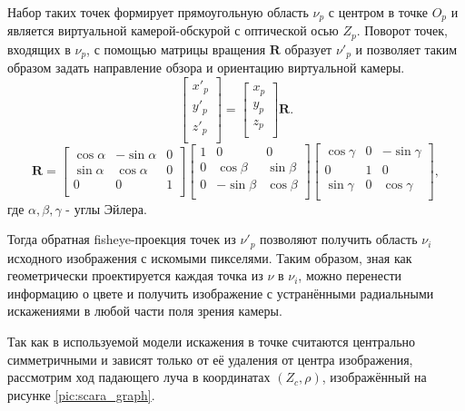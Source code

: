 Набор таких точек формирует прямоугольную область $\nu_p$ с центром в точке $O_p$ и является виртуальной камерой-обскурой        %
с оптической осью $Z_p$. Поворот точек, входящих в $\nu_p$, с помощью матрицы вращения $\bm{R}$ образует $\nu'_p$ и
 позволяет таким образом задать направление обзора и ориентацию виртуальной камеры. 
\begin{equation}
    \label{eq:sweeped}
    \left[\begin{matrix}x'_p\\y'_p\\z'_p\\\end{matrix}\right] = \left[\begin{matrix}x_p\\y_p\\z_p\\\end{matrix}\right] \bm{R}.
\end{equation}  
\begin{equation}
    \label{eq:R}
    \bm{R} = \left[\begin{matrix}\cos{\alpha}&-\sin{\alpha}&0\\\sin{\alpha}&\cos{\alpha}&0\\0&0&1\\\end{matrix}\right]\left[\begin{matrix}1&0&0\\0&\cos{\beta}&\sin{\beta}\\0&-\sin{\beta}&\cos{\beta}\\\end{matrix}\right]\left[\begin{matrix}\cos{\gamma}&0&-\sin{\gamma}\\0&1&0\\\sin{\gamma}&0&\cos{\gamma}\\\end{matrix}\right],
\end{equation} 
где $\alpha, \beta, \gamma$ - углы Эйлера. %

Тогда обратная fisheye-проекция точек из $\nu'_p$ позволяют получить область $\nu_i$ исходного изображения с искомыми пикселями. 
Таким образом, зная как геометрически проектируется каждая точка из $\nu$ в $\nu_i$, можно перенести информацию о цвете и получить 
изображение с устранёнными радиальными искажениями в любой части поля зрения камеры. 

Так как в используемой модели искажения в точке считаются центрально симметричными и зависят только от её удаления от центра изображения, 
рассмотрим ход падающего луча в координатах $(Z_c, \rho)$, изображённый на рисунке \ref{pic:scara_graph}.

